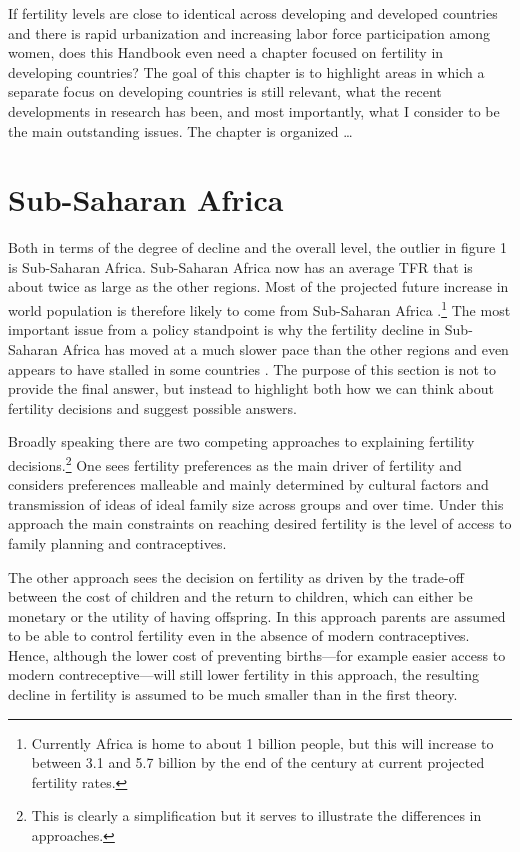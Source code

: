 \documentclass[]{article}
\begin{document}
If fertility levels are close to identical across developing and developed countries and there is rapid urbanization and increasing labor force participation among women, does this Handbook even need a chapter focused on fertility in developing countries? The goal of this chapter is to highlight areas in which a separate focus on developing countries is still relevant, what the recent developments in research has been, and most importantly, what I consider to be the main outstanding issues. The chapter is organized \ldots{}

\section{Sub-Saharan Africa}\label{sub-saharan-africa}

Both in terms of the degree of decline and the overall level, the outlier in figure 1 is Sub-Saharan Africa. Sub-Saharan Africa now has an average TFR that is about twice as large as the other regions. Most of the projected future increase in world population is therefore likely to come from Sub-Saharan Africa \citep{Gerland2014}.\footnote{Currently Africa is home to about 1 billion people, but this will increase to between 3.1 and 5.7 billion by the end of the century at current projected fertility rates.} The most important issue from a policy standpoint is why the fertility decline in Sub-Saharan Africa has moved at a much slower pace than the other regions and even appears to have stalled in some countries \citep{Ainsworth1996a,Singh2017}. The purpose of this section is not to provide the final answer, but instead to highlight both how we can think about fertility decisions and suggest possible answers.

Broadly speaking there are two competing approaches to explaining fertility decisions.\footnote{This is clearly a simplification but it serves to illustrate the differences in approaches.} One sees fertility preferences as the main driver of fertility and considers preferences malleable and mainly determined by cultural factors and transmission of ideas of ideal family size across groups and over time. Under this approach the main constraints on reaching desired fertility is the level of access to family planning and contraceptives.

The other approach sees the decision on fertility as driven by the trade-off between the cost of children and the return to children, which can either be monetary or the utility of having offspring. In this approach parents are assumed to be able to control fertility even in the absence of modern contraceptives. Hence, although the lower cost of preventing births---for example easier access to modern contreceptive---will still lower fertility in this approach, the resulting decline in fertility is assumed to be much smaller than in the first theory.
\end{document}

